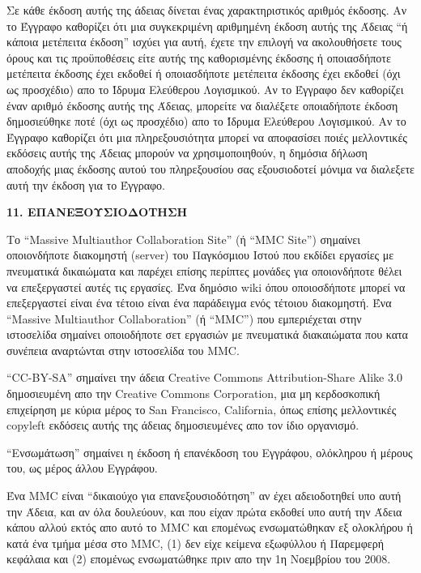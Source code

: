 Σε κάθε έκδοση αυτής της άδειας δίνεται ένας χαρακτηριστικός αριθμός έκδοσης. Αν το Έγγραφο καθορίζει ότι μια συγκεκριμένη αριθμημένη έκδοση αυτής της Άδειας “ή κάποια μετέπειτα έκδοση”  ισχύει για αυτή, έχετε την επιλογή να ακολουθήσετε τους όρους και τις προϋποθέσεις είτε αυτής της καθορισμένης έκδοσης ή οποιασδήποτε μετέπειτα έκδοσης έχει εκδοθεί ή οποιασδήποτε μετέπειτα έκδοσης έχει εκδοθεί (όχι ως προσχέδιο) απο το Ίδρυμα Ελεύθερου Λογισμικού. Αν το Έγγραφο δεν καθορίζει έναν αριθμό έκδοσης αυτής της Άδειας, μπορείτε να διαλέξετε οποιαδήποτε έκδοση δημοσιεύθηκε ποτέ (όχι ως προσχέδιο) απο το Ίδρυμα Ελεύθερου Λογισμικού. Αν το Έγγραφο καθορίζει ότι μια πληρεξουσιότητα μπορεί να αποφασίσει ποιές μελλοντικές εκδόσεις αυτής της Άδειας μπορούν να χρησιμοποιηθούν, η δημόσια δήλωση αποδοχής μιας έκδοσης αυτού του πληρεξουσίου σας εξουσιοδοτεί μόνιμα να διαλεξετε αυτή την έκδοση για το Έγγραφο.


\begin{center}
{\Large\bf 11. ΕΠΑΝΕΞΟΥΣΙΟΔΟΤΗΣΗ\par}
\end{center}


Το “Massive Multiauthor Collaboration Site” (ή “MMC Site”) σημαίνει οποιονδήποτε διακομηστή (server) του Παγκόσμιου Ιστού που εκδίδει εργασίες με πνευματικά δικαιώματα και παρέχει επίσης περίπτες μονάδες για οποιονδήποτε θέλει να επεξεργαστεί αυτές τις εργασίες. Ένα δημόσιο wiki όπου οποιοσδήποτε μπορεί να επεξεργαστεί είναι ένα τέτοιο είναι ένα παράδειγμα ενός τέτοιου διακομηστή. Ένα “Massive Multiauthor Collaboration” (ή “MMC”) που εμπεριέχεται στην ιστοσελίδα σημαίνει οποιοδήποτε σετ εργασιών με πνευματικά διακαιώματα που κατα συνέπεια αναρτώνται στην ιστοσελίδα του MMC. 

“CC-BY-SA” σημαίνει την άδεια Creative Commons Attribution-Share Alike 3.0 δημοσιευμένη απο την Creative Commons Corporation, μια μη κερδοσκοπική επιχείρηση με κύρια μέρος το San Francisco, California, όπως επίσης μελλοντικές copyleft εκδόσεις αυτής της άδειας δημοσιευμένες απο τον ίδιο οργανισμό. 

“Ενσωμάτωση” σημαίνει η έκδοση ή επανέκδοση του Εγγράφου, ολόκληρου ή μέρους του, ως μέρος άλλου Εγγράφου.

Ένα MMC είναι ``δικαιούχο για επανεξουσιοδότηση'' αν έχει αδειοδοτηθεί υπο αυτή την Άδεια, και αν όλα δουλεύουν, και που είχαν πρώτα εκδοθεί υπο αυτή την Άδεια κάπου αλλού εκτός απο αυτό το MMC και επομένως ενσωματώθηκαν εξ ολοκλήρου ή κατά ένα τμήμα μέσα στο MMC, (1) δεν είχε κείμενα εξωφύλλου ή Παρεμφερή κεφάλαια και (2) επομένως ενσωματώθηκε πριν απο την 1η Νοεμβρίου του 2008.

